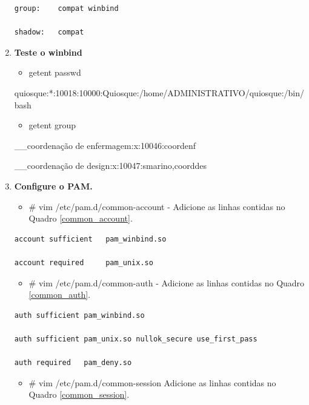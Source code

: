 \begin{enumerate}
\begin{lstlisting}[caption=Arquivo /etc/nsswitch.conf,label={nsswitch_conf}]
group:    compat winbind

shadow:   compat
		\end{lstlisting}

 	\item \textbf{Teste o winbind}
		\begin{itemize}
			\item {getent passwd}
		\end{itemize}
		quiosque:*:10018:10000:Quiosque:/home/ADMINISTRATIVO/quiosque:/bin/bash

		\begin{itemize}
			\item {getent group}
		\end{itemize}

		\_\_coordenação de enfermagem:x:10046:coordenf

		\_\_coordenação de design:x:10047:smarino,coorddes

	\item \textbf{Configure o PAM.}
		\begin{itemize}
			\item {\# vim /etc/pam.d/common-account} - Adicione as linhas contidas no Quadro \ref{common_account}.\\
		\end{itemize}

		\begin{lstlisting}[caption=Arquivo /etc/pam.d/common-account,label={common_account}]
account sufficient   pam_winbind.so

account required     pam_unix.so
		\end{lstlisting}

		\begin{itemize}
			\item {\# vim /etc/pam.d/common-auth} - Adicione as linhas contidas no Quadro \ref{common_auth}.\\
		\end{itemize}

		\begin{lstlisting}[caption=Arquivo /etc/pam.d/common-auth,label={common_auth}]
auth sufficient pam_winbind.so

auth sufficient pam_unix.so nullok_secure use_first_pass

auth required   pam_deny.so
		\end{lstlisting}

		\begin{itemize}
			\item {\# vim /etc/pam.d/common-session} Adicione as linhas contidas no Quadro \ref{common_session}.\\
		\end{itemize}


\end{enumerate}
